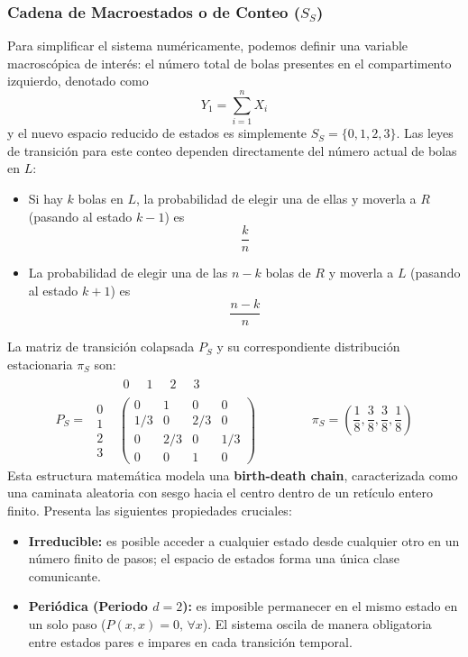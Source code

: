 \subsubsection{Cadena de Macroestados o de Conteo ($S_S$)}
\noindent
Para simplificar el sistema numéricamente, podemos definir una variable macroscópica de interés: el número total de bolas presentes en el compartimento izquierdo, denotado como 
$$Y_1 = \sum_{i=1}^{n} X_i$$
y el nuevo espacio reducido de estados es simplemente $S_S = \{0, 1, 2, 3\}$. Las leyes de transición para este conteo dependen directamente del número actual de bolas en $L$:
\begin{itemize}
    \item Si hay $k$ bolas en $L$, la probabilidad de elegir una de ellas y moverla a $R$ (pasando al estado $k-1$) es 
    $$\frac{k}{n}$$
    \item La probabilidad de elegir una de las $n-k$ bolas de $R$ y moverla a $L$ (pasando al estado $k+1$) es 
    $$\frac{n-k}{n}$$
\end{itemize}
La matriz de transición colapsada $P_S$ y su correspondiente distribución estacionaria $\pi_S$ son:
\[
P_S = 
\begin{matrix}
    & \begin{matrix} 0 & \;\;1 & \;\;2 & \;\;3 \end{matrix} \\
    \begin{matrix} 0 \\ 1 \\ 2 \\ 3 \end{matrix} &
    \begin{pmatrix}
        0 & 1 & 0 & 0 \\[0.1cm]
        1/3 & 0 & 2/3 & 0 \\[0.1cm]
        0 & 2/3 & 0 & 1/3 \\[0.1cm]
        0 & 0 & 1 & 0
    \end{pmatrix}
\end{matrix}
\qquad\qquad \pi_S = \left( \frac{1}{8}, \frac{3}{8}, \frac{3}{8}, \frac{1}{8} \right)
\]
Esta estructura matemática modela una \textbf{birth-death chain}, caracterizada como una caminata aleatoria con sesgo hacia el centro dentro de un retículo entero finito. Presenta las siguientes propiedades cruciales:
\begin{itemize}
    \item \textbf{Irreducible:} es posible acceder a cualquier estado desde cualquier otro en un número finito de pasos; el espacio de estados forma una única clase comunicante.
    \item \textbf{Periódica (Periodo $d=2$):} es imposible permanecer en el mismo estado en un solo paso ($P(x,x)=0, \, \forall x$). El sistema oscila de manera obligatoria entre estados pares e impares en cada transición temporal.
\end{itemize}

